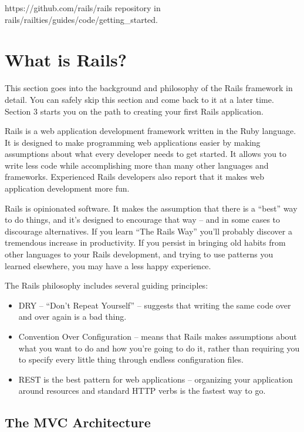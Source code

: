 \documentclass[10pt]{book}
\begin{document}
https://github.com/rails/rails repository in rails/railties/guides/code/getting\_started.

\section{ What is Rails?}

This section goes into the background and philosophy of the Rails framework in detail. You can safely skip this section and come back to it at a later time. Section 3 starts you on the path to creating your first Rails application.

Rails is a web application development framework written in the Ruby language. It is designed to make programming web applications easier by making assumptions about what every developer needs to get started. It allows you to write less code while accomplishing more than many other languages and frameworks. Experienced Rails developers also report that it makes web application development more fun.

Rails is opinionated software. It makes the assumption that there is a “best” way to do things, and it’s designed to encourage that way – and in some cases to discourage alternatives. If you learn “The Rails Way” you’ll probably discover a tremendous increase in productivity. If you persist in bringing old habits from other languages to your Rails development, and trying to use patterns you learned elsewhere, you may have a less happy experience.

The Rails philosophy includes several guiding principles:
\begin{itemize}
	\item DRY – “Don’t Repeat Yourself” – suggests that writing the same code over and over again is a bad thing.
	\item Convention Over Configuration – means that Rails makes assumptions about what you want to do and how you’re going to do it, rather than requiring you to specify every little thing through endless configuration files.
	\item REST is the best pattern for web applications – organizing your application around resources and standard HTTP verbs is the fastest way to go.
\end{itemize}

\subsection{ The MVC Architecture}
\end{document}

